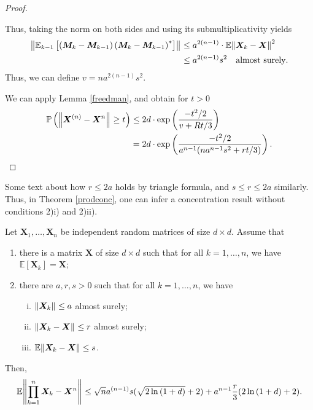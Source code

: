 \begin{proof}
\begin{enumerate}[1)]
     Thus, taking the norm on both sides and using its submultiplicativity yields 
     \begin{align*}
       \norm{\mathbb{E}_{k-1} \left[\left(\bm{M}_k-\bm{M}_{k-1}\right)\left(\bm{M}_k-\bm{M}_{k-1}\right)^{*}\right] }_{} &\leq a^{2(n-1)} \cdot \mathbb{E} \norm{\bm{X}_k-\bm{X}}_{}^{2} \\
                                                                                                                         & \leq a^{2(n-1)} s^{2} \quad \text{almost surely}.
     \end{align*}
     Thus, we can define \( v= na^{2(n-1)}s^{2} \).
  \end{enumerate}
  We can apply Lemma \ref{freedman}, and obtain for \( t >0 \)
\begin{align*}
  \mathbb{P}\left(\norm{\bm{X}^{(n)}- \bm{X}^{n}}_{} \geq t\right) &\leq 2d \cdot \operatorname{exp}\left(\frac{-t^2/2}{v+Rt/3}\right) \\
                                                                   &= 2d \cdot \operatorname{exp}\left(\frac{-t^2/2}{a^{n-1}(na^{n-1}s^2+rt/3)}\right).
\end{align*}

\end{proof}

Some text about how \( r \leq 2a \) holds by triangle formula, and \( s \leq r \leq 2a \) similarly. Thus, in Theorem \ref{prodconc}, one can infer a concentration result without conditions 2)i) and 2)ii).

\begin{corl}
    \label{prodbound}
    Let \( \bm{X}_1, \dots, \bm{X}_n \) be independent random matrices of size \( d \times d \). Assume that 
    \begin{enumerate}[1)]
      \item there is a matrix \( \bm{X} \) of size \( d\times d \) such that for all \( k=1, \dots, n \), we have \(\mathbb{E}\left[\bm{X}_k\right]=\bm{X}\);
      \item there are \( a,r,s >0 \) such that for all \( k=1,\dots, n \), we have 
        \begin{enumerate}[i)]
          \item \( \norm{\bm{X}_k}_{} \leq a \) almost surely;
          \item \( \norm{\bm{X}_k-\bm{X}}_{} \leq r\) almost surely;
          \item \( \mathbb{E}\norm{\bm{X}_k-\bm{X}} \leq s \).
        \end{enumerate}
            \end{enumerate}
    Then,
  \[ \mathbb{E} \norm{ \prod_{k=1}^{n} \bm{X}_k - \bm{X}^{n}}_{} \leq \sqrt{n}a^{(n-1)}s (\sqrt{2 \operatorname{ln}\left(1+d\right)}+2) + a^{n-1} \frac{r}{3} (2 \operatorname{ln}\left(1+d\right)+2).\]

\end{corl}

